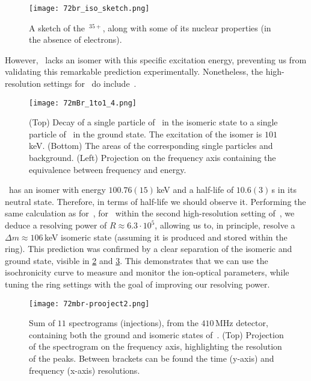   \begin{figure}[hbt]
    \centering
    \texttt{[image: 72br\_iso\_sketch.png]}
    \caption{A sketch of the \,$^{35+}$, along with some of its nuclear properties (in the absence of electrons).}
    \label{fig:chap3:72mbr_sketch}
  \end{figure}

  However, \, lacks an isomer with this specific excitation energy, preventing us from validating this remarkable prediction experimentally. Nonetheless, the high-resolution settings for \, do include \,. 

  \begin{figure}[hbt]
    \centering
    \texttt{[image: 72mBr\_1to1\_4.png]}
    \caption{(Top) Decay of a single particle of \, in the isomeric state to  a single particle of \, in the ground state. The excitation of the isomer  is $101$\,keV. (Bottom) The areas of the corresponding single particles and background. (Left) Projection on the frequency axis containing the equivalence between frequency and energy.}
   \label{fig:chap3:72mBr1to1}
  \end{figure}

  \, has an isomer with energy $100.76(15)$\,keV \cite{ENSDF} and a half-life of $10.6(3)$\,s \cite{ENSDF} in its neutral state. Therefore, in terms of half-life we should observe it.
  Performing the same calculation as for \,, for \, within the second high-resolution setting of \,, we deduce a resolving power of $R \approx 6.3\cdot10^5$, allowing us to, in principle, resolve a $\Delta m \approx 106$\,keV isomeric state (assuming it is produced and stored within the ring). This prediction was confirmed by a clear separation of the isomeric and ground state, visible in \cref{fig:chap3:72mBr1to1} and \cref{fig:chap3:72mBrproject}. This demonstrates that we can use the isochronicity curve to measure and monitor the ion-optical parameters, while tuning the ring settings with the goal of improving our resolving power.

  \begin{figure}[hbt]
  \centering
  \texttt{[image: 72mbr-prooject2.png]}
  \caption{Sum of $11$ spectrograms (injections), from the $410$\,MHz detector, containing both the ground and isomeric states of \,. (Top) Projection of the spectrogram on the frequency axis, highlighting the resolution of the peaks. Between brackets can be found the time (y-axis) and frequency (x-axis) resolutions.}
  \label{fig:chap3:72mBrproject}
  \end{figure}

